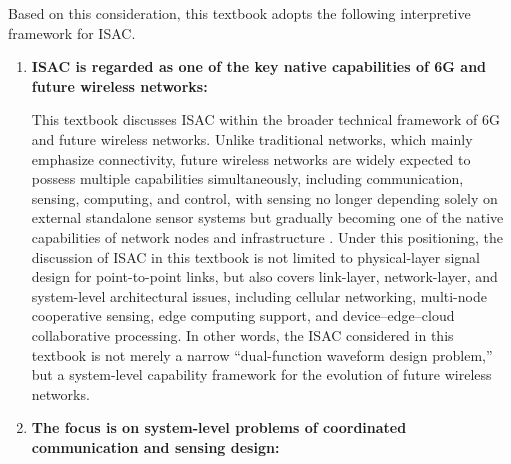 Based on this consideration, this textbook adopts the following interpretive framework for ISAC.
\begin{enumerate}[label=(\arabic*)]
    \item \textbf{ISAC is regarded as one of the key native capabilities of 6G and future wireless networks:}
    
    This textbook discusses ISAC within the broader technical framework of 6G and future wireless networks. Unlike traditional networks, which mainly emphasize connectivity, future wireless networks are widely expected to possess multiple capabilities simultaneously, including communication, sensing, computing, and control, with sensing no longer depending solely on external standalone sensor systems but gradually becoming one of the native capabilities of network nodes and infrastructure \cite{Liu2022ISAC,Gonzalez2024integrated,Saad2020Vision6G}. Under this positioning, the discussion of ISAC in this textbook is not limited to physical-layer signal design for point-to-point links, but also covers link-layer, network-layer, and system-level architectural issues, including cellular networking, multi-node cooperative sensing, edge computing support, and device--edge--cloud collaborative processing. In other words, the ISAC considered in this textbook is not merely a narrow ``dual-function waveform design problem,'' but a system-level capability framework for the evolution of future wireless networks.
    
    \item \textbf{The focus is on system-level problems of coordinated communication and sensing design:}
    

\end{enumerate}
